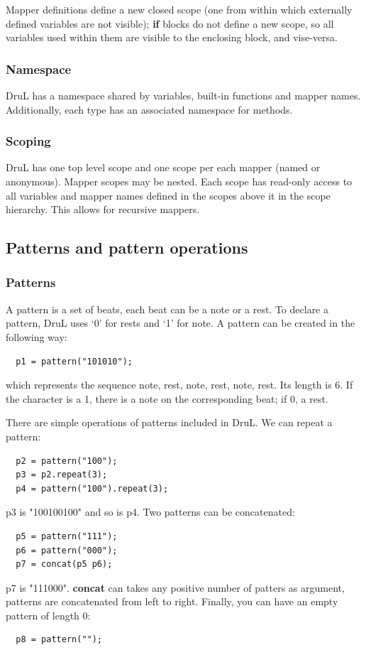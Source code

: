 \documentclass[11pt,twoside]{article}
\begin{document}
Mapper definitions define a new closed scope (one from within which externally defined variables are not visible); \textbf{if} blocks do not define a new scope, so all variables used within them are visible to the enclosing  block, and vise-versa.

\subsubsection{Namespace}
DruL has a namespace shared by variables, built-in functions and 
mapper names. Additionally, each type has an associated namespace for methods.

\subsubsection{Scoping}
DruL has one top level scope and one scope per each mapper
(named or anonymous). Mapper scopes may be nested.
Each scope has read-only access to all variables and mapper names
defined in the scopes above it in the scope hierarchy.
This allows for recursive mappers.

\subsection{Patterns and pattern operations}

\subsubsection{Patterns}
A pattern is a set of beats, each beat can be a note or a rest.
To declare a pattern, DruL uses `0' for rests and `1' for note.
A pattern can be created in the following way:
\begin{verbatim}
  p1 = pattern("101010");
\end{verbatim}
which represents the sequence {note, rest, note, rest, note, rest}.
Its length is $6$. If the character is a 1, there is a note on the
corresponding beat; if 0, a rest.

There are simple operations of patterns included in DruL. We
can repeat a pattern:
\begin{verbatim}
  p2 = pattern("100");
  p3 = p2.repeat(3);
  p4 = pattern("100").repeat(3);
\end{verbatim}
p3 is "100100100" and so is p4. Two patterns can be concatenated:
\begin{verbatim}
  p5 = pattern("111");
  p6 = pattern("000");
  p7 = concat(p5 p6);
\end{verbatim}
p7 is "111000". \textbf{concat} can takes any positive number of
patters as argument, patterns are concatenated from left to right.
Finally, you can have an empty pattern of length 0:
\begin{verbatim}
  p8 = pattern("");
\end{verbatim}
\end{document}
